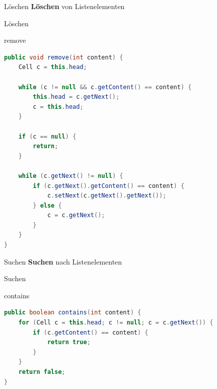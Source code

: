 \documentclass[18pt]{beamer}
\begin{document}
\begin{frame}{Löschen}
    \textbf{Löschen} von Listenelementen
\end{frame}

\begin{frame}[fragile]{Löschen}
    \begin{exampleblock}{remove}
        \begin{lstlisting}[language=Java,basicstyle=\scriptsize]
public void remove(int content) {
    Cell c = this.head;

    while (c != null && c.getContent() == content) {
        this.head = c.getNext();
        c = this.head;
    }

    if (c == null) {
        return;
    }

    while (c.getNext() != null) {
        if (c.getNext().getContent() == content) {
            c.setNext(c.getNext().getNext());
        } else {
            c = c.getNext();
        }
    }
}
        \end{lstlisting}

    \end{exampleblock}

\end{frame}

\begin{frame}{Suchen}
    \textbf{Suchen} nach Listenelementen
\end{frame}

\begin{frame}[fragile]{Suchen}
    \begin{exampleblock}{contains}
        \begin{lstlisting}[language=Java,basicstyle=\scriptsize]
public boolean contains(int content) {
    for (Cell c = this.head; c != null; c = c.getNext()) {
        if (c.getContent() == content) {
            return true;
        }
    }
    return false;
}
        \end{lstlisting}

    \end{exampleblock}

\end{frame}
\end{document}
